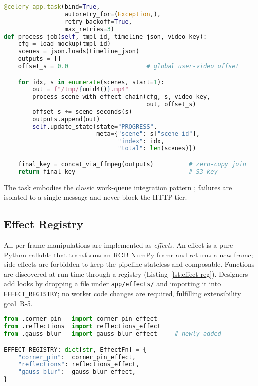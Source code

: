 \begin{lstlisting}[language=python,caption={Scene-aware Celery task},
  label={lst:celery-task},basicstyle=\scriptsize\ttfamily]
@celery_app.task(bind=True,
                 autoretry_for=(Exception,),
                 retry_backoff=True,
                 max_retries=3)
def process_job(self, tmpl_id, timeline_json, video_key):
    cfg = load_mockup(tmpl_id)
    scenes = json.loads(timeline_json)
    outputs = []
    offset_s = 0.0                      # global user-video offset

    for idx, s in enumerate(scenes, start=1):
        out = f"/tmp/{uuid4()}.mp4"
        process_scene_with_effect_chain(cfg, s, video_key,
                                        out, offset_s)
        offset_s += scene_seconds(s)
        outputs.append(out)
        self.update_state(state="PROGRESS",
                          meta={"scene": s["scene_id"],
                                "index": idx,
                                "total": len(scenes)})

    final_key = concat_via_ffmpeg(outputs)          # zero-copy join
    return final_key                                # S3 key
\end{lstlisting}

The task embodies the classic work-queue integration pattern
\cite{fowlerQueue}; failures are isolated to a single message and never block
the HTTP tier.

\subsection{Effect Registry}
\label{sec:effect-registry}

All per-frame manipulations are implemented as \emph{effects}.  An effect is a
pure Python callable that transforms an RGB NumPy frame and returns a new
frame; side effects are forbidden to keep the pipeline stateless and
composable.  Functions are discovered at run-time through a registry
(Listing~\ref{lst:effect-reg}).  Designers add looks by dropping a file under
\texttt{app/effects/} and importing it into \texttt{EFFECT\_REGISTRY}; no
worker code changes are required, fulfilling extensibility goal~R-5.

\begin{lstlisting}[language=python,caption={Pluggable effect registry},
  label={lst:effect-reg},basicstyle=\scriptsize\ttfamily]
from .corner_pin   import corner_pin_effect
from .reflections  import reflections_effect
from .gauss_blur   import gauss_blur_effect     # newly added

EFFECT_REGISTRY: dict[str, EffectFn] = {
    "corner_pin":  corner_pin_effect,
    "reflections": reflections_effect,
    "gauss_blur":  gauss_blur_effect,
}
\end{lstlisting}

